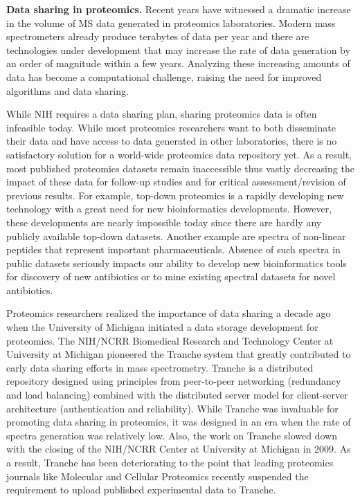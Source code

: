 \documentclass[arial,11pt]{article}
\begin{document}
{\bf Data sharing in proteomics.} Recent years have witnessed a dramatic increase in the volume of MS data generated in proteomics laboratories. Modern mass spectrometers already produce terabytes of data per year and there are technologies under development that may increase the rate of data generation by an order of magnitude within a few years. Analyzing these increasing amounts of data has become a computational challenge, raising the need for improved algorithms and data sharing.

While NIH requires a data sharing plan, sharing proteomics data is often infeasible today. While most proteomics researchers want to both disseminate their data and have access to data generated in other laboratories, there is no satisfactory solution for a world-wide proteomics data repository yet. As a result, most published proteomics datasets remain inaccessible thus vastly decreasing the impact of these data for follow-up studies and for critical assessment/revision of previous results.  For example, top-down proteomics is a rapidly developing new technology with a great need for new bioinformatics developments.  However, these developments are nearly impossible today since there are hardly any publicly available top-down datasets.  Another example are spectra of non-linear peptides that represent important pharmaceuticals.
Absence of such spectra in public datasets seriously impacts our ability to develop new bioinformatics tools for discovery of new antibiotics or to mine existing spectral datasets for novel antibiotics.

Proteomics researchers realized the importance of data sharing a decade ago when the University of Michigan initiated a data storage development for proteomics. The NIH/NCRR Biomedical Research and Technology Center at University at Michigan pioneered the Tranche system that greatly contributed to early data sharing efforts in mass spectrometry.  Tranche is a distributed repository designed using principles from peer-to-peer networking (redundancy and load balancing) combined with the distributed server model for client-server architecture (authentication and reliability). While Tranche was invaluable for promoting data sharing in proteomics, it was designed in an era when the rate of spectra generation was relatively low.  Also, the work on Tranche slowed down
with the closing of the NIH/NCRR Center at University at Michigan in 2009.  As a result, Tranche has been deteriorating to the point that leading proteomics journals like Molecular and Cellular Proteomics recently suspended the requirement to upload published experimental data to Tranche.
\end{document}
